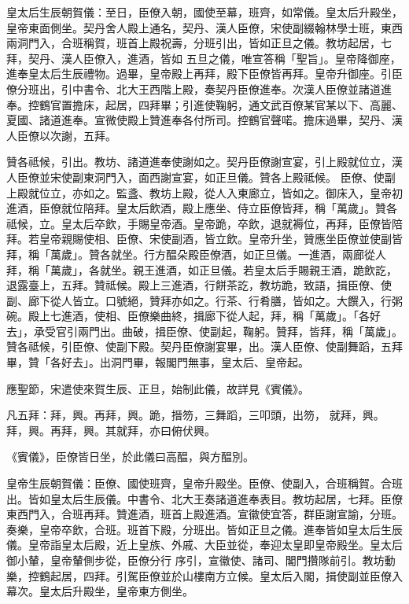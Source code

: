 
\begin{pinyinscope}

 皇太后生辰朝賀儀：至日，臣僚入朝，國使至幕，班齊，如常儀。皇太后升殿坐，皇帝東面側坐。契丹舍人殿上通名，契丹、漢人臣僚，宋使副綴翰林學士班，東西兩洞門入，合班稱賀，班首上殿祝壽，分班引出，皆如正旦之儀。教坊起居，七拜，契丹、漢人臣僚入，進酒，皆如
 五旦之儀，唯宣答稱「聖旨」。皇帝降御座，進奉皇太后生辰禮物。過畢，皇帝殿上再拜，殿下臣僚皆再拜。皇帝升御座。引臣僚分班出，引中書令、北大王西階上殿，奏契丹臣僚進奉。次漢人臣僚並諸道進奉。控鶴官置擔床，起居，四拜畢；引進使鞠躬，通文武百僚某官某以下、高麗、夏國、諸道進奉。宣微使殿上贊進奉各付所司。控鶴官聲喏。擔床過畢，契丹、漢人臣僚以次謝，五拜。



 贊各祗候，引出。教坊、諸道進奉使謝如之。契丹臣僚謝宣宴，引上殿就位立，漢人臣僚並宋使副東洞門入，面西謝宣宴，如正旦儀。贊各上殿祗候。
 臣僚、使副上殿就位立，亦如之。監盞、教坊上殿，從人入東廊立，皆如之。御床入，皇帝初進酒，臣僚就位陪拜。皇太后飲酒，殿上應坐、侍立臣僚皆拜，稱「萬歲」。贊各祗候，立。皇太后卒飲，手賜皇帝酒。皇帝跪，卒飲，退就褥位，再拜，臣僚皆陪拜。若皇帝親賜使相、臣僚、宋使副酒，皆立飲。皇帝升坐，贊應坐臣僚並使副皆拜，稱「萬歲」。贊各就坐。行方醖朵殿臣僚酒，如正旦儀。一進酒，兩廊從人拜，稱「萬歲」，各就坐。親王進酒，如正旦儀。若皇太后手賜親王酒，跪飲訖，退露臺上，五拜。贊祗候。殿上三進酒，行餅茶訖，教坊跪，致語，揖臣僚、使
 副、廊下從人皆立。口號絕，贊拜亦如之。行茶、行肴膳，皆如之。大饌入，行粥碗。殿上七進酒，使相、臣僚樂曲終，揖廊下從人起，拜，稱「萬歲」。「各好去」，承受官引兩門出。曲破，揖臣僚、使副起，鞠躬。贊拜，皆拜，稱「萬歲」。贊各祗候，引臣僚、使副下殿。契丹臣僚謝宴畢，出。漢人臣僚、使副舞蹈，五拜畢，贊「各好去」。出洞門畢，報閣門無事，皇太后、皇帝起。



 應聖節，宋遣使來賀生辰、正旦，始制此儀，故詳見《賓儀》。



 凡五拜：拜，興。再拜，興。跪，搢笏，三舞蹈，三叩頭，出笏，
 就拜，興。拜，興。再拜，興。其就拜，亦曰俯伏興。



 《賓儀》，臣僚皆日坐，於此儀曰高醖，與方醖別。



 皇帝生辰朝賀儀：臣僚、國使班齊，皇帝升殿坐。臣僚、使副入，合班稱賀。合班出。皆如皇太后生辰儀。中書令、北大王奏諸道進奉表目。教坊起居，七拜。臣僚東西門入，合班再拜。贊進酒，班首上殿進酒。宣徽使宜答，群臣謝宣諭，分班。奏樂，皇帝卒飲，合班。班首下殿，分班出。皆如正旦之儀。進奉皆如皇太后生辰儀。皇帝詣皇太后殿，近上皇族、外戚、大臣並從，奉迎太皇即皇帝殿坐。皇太后御小輦，皇帝輦側步從，臣僚分行
 序引，宣徽使、諸司、閣門攢隊前引。教坊動樂，控鶴起居，四拜。引駕臣僚並於山樓南方立候。皇太后入閣，揖使副並臣僚入幕次。皇太后升殿坐，皇帝東方側坐。




\end{pinyinscope}
